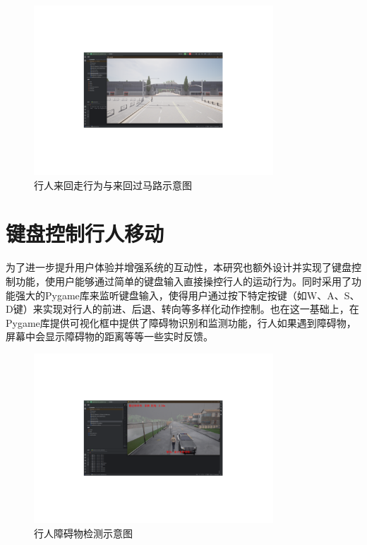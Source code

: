 \begin{figure}[H]
    \centering
    \includegraphics[width=0.8\textwidth]{images/walking_back_and_forth.pdf}
    \caption{行人来回走行为与来回过马路示意图}
    \label{f.walking_back_and_forth}
\end{figure}

\section{键盘控制行人移动}
为了进一步提升用户体验并增强系统的互动性，本研究也额外设计并实现了键盘控制功能，使用户能够通过简单的键盘输入直接操控行人的运动行为。同时采用了功能强大的Pygame库来监听键盘输入，使得用户通过按下特定按键（如W、A、S、D键）来实现对行人的前进、后退、转向等多样化动作控制。也在这一基础上，在Pygame库提供可视化框中提供了障碍物识别和监测功能，行人如果遇到障碍物，屏幕中会显示障碍物的距离等等一些实时反馈。

\begin{figure}[H]
    \centering
    \includegraphics[width=0.8\textwidth]{images/collision_detection.pdf}
    \caption{行人障碍物检测示意图}
    \label{f.collision_detection}
\end{figure}


